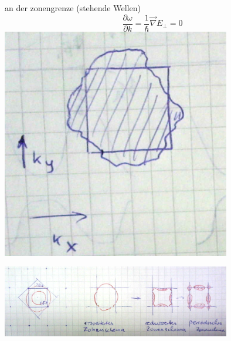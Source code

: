 an der zonengrenze (stehende Wellen)
\[\frac{\partial\omega}{\partial k}=\frac{1}{\hbar}\vec \nabla E_\bot =0\]
\includegraphics[width=0.75\textwidth]{kap06_48.png}






\includegraphics[width=0.75\textwidth]{kap06_49.png}



